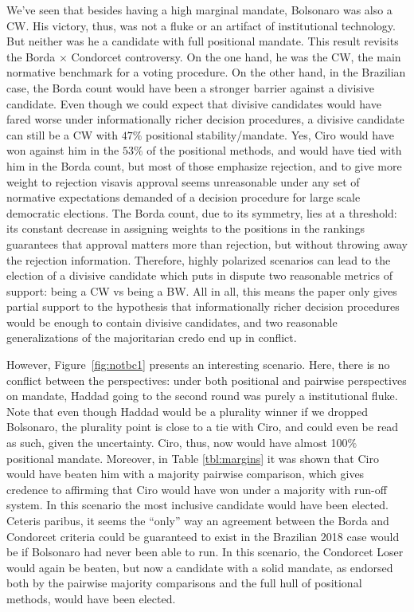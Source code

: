 \documentclass[hidelinks,11pt]{article}
\begin{document}
    We've seen that besides having a high marginal mandate, Bolsonaro was also a
    CW. His victory, thus, was not a fluke or an artifact of institutional
    technology. But neither was he a candidate with full positional mandate.
    This result revisits the Borda \(\times\) Condorcet controversy. On the one
    hand, he was the CW, the main normative benchmark for a voting procedure. On
    the other hand, in the Brazilian case, the Borda count would have been a
    stronger barrier against a divisive candidate. Even though we could expect
    that divisive candidates would have fared worse under informationally richer
    decision procedures, a divisive candidate can still be a CW with \(47\%\)
    positional stability/mandate. Yes, Ciro would have won against him in the
    \(53\%\) of the positional methods, and would have tied with him in the
    Borda count, but most of those emphasize rejection, and to give more weight
    to rejection visavis approval seems unreasonable under any set of normative
    expectations demanded of a decision procedure for large scale democratic
    elections. The Borda count, due to its symmetry, lies at a threshold: its
    constant decrease in assigning weights to the positions in the rankings
    guarantees that approval matters more than rejection, but without throwing
    away the rejection information. Therefore, highly polarized scenarios can
    lead to the election of a divisive candidate which puts in dispute two
    reasonable metrics of support: being a CW vs being a BW. All in all, this
    means the paper only gives partial support to the hypothesis that
    informationally richer decision procedures would be enough to contain
    divisive candidates, and two reasonable generalizations of the majoritarian
    credo end up in conflict.

    However, Figure~\ref{fig:notbc1} presents an interesting scenario. Here,
    there is no conflict between the perspectives: under both positional and
    pairwise perspectives on mandate, Haddad going to the second round was
    purely a institutional fluke. Note that even though Haddad would be a
    plurality winner if we dropped Bolsonaro, the plurality point is close to a
    tie with Ciro, and could even be read as such, given the uncertainty. Ciro,
    thus, now would have almost 100\(\%\) positional mandate. Moreover, in Table
    \ref{tbl:margins} it was shown that Ciro would have beaten him with a
    majority pairwise comparison, which gives credence to affirming that Ciro
    would have won under a majority with run-off system. In this scenario the
    most inclusive candidate would have been elected. Ceteris paribus, it seems
    the ``only'' way an agreement between the Borda and Condorcet criteria could
    be guaranteed to exist in the Brazilian 2018 case would be if Bolsonaro had
    never been able to run. In this scenario, the Condorcet Loser would again be
    beaten, but now a candidate with a solid mandate, as endorsed both by the
    pairwise majority comparisons and the full hull of positional methods, would
    have been elected.
\end{document}
